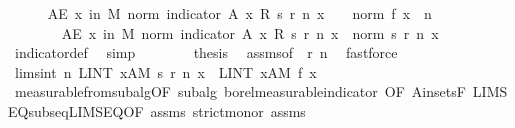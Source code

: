 \begin{isabellebody}
\isanewline
\ \ \ \ \isamarkupfalse%
\ {\isachardoublequoteopen}AE\ x\ in\ M{\isachardot}{\kern0pt}\ norm\ {\isacharparenleft}{\kern0pt}indicator\ A\ x\ {\isacharasterisk}{\kern0pt}\isactrlsub R\ s\ {\isacharparenleft}{\kern0pt}r\ n{\isacharparenright}{\kern0pt}\ x{\isacharparenright}{\kern0pt}\ {\isasymle}\ {}\ {\isacharasterisk}{\kern0pt}\ norm\ {\isacharparenleft}{\kern0pt}f\ x{\isacharparenright}{\kern0pt}{\isachardoublequoteclose}\ \ n\isanewline
\ \ \ \ \isamarkupfalse%
\ {\isacharminus}{\kern0pt}\isanewline
\ \ \ \ \ \ \isamarkupfalse%
\ {\isachardoublequoteopen}AE\ x\ in\ M{\isachardot}{\kern0pt}\ norm\ {\isacharparenleft}{\kern0pt}indicator\ A\ x\ {\isacharasterisk}{\kern0pt}\isactrlsub R\ s\ {\isacharparenleft}{\kern0pt}r\ n{\isacharparenright}{\kern0pt}\ x{\isacharparenright}{\kern0pt}\ {\isasymle}\ norm\ {\isacharparenleft}{\kern0pt}s\ {\isacharparenleft}{\kern0pt}r\ n{\isacharparenright}{\kern0pt}\ x{\isacharparenright}{\kern0pt}{\isachardoublequoteclose}\ \isamarkupfalse%
\ indicator{\isacharunderscore}{\kern0pt}def\ \isamarkupfalse%
\ simp\isanewline
\ \ \ \ \ \ \isamarkupfalse%
\ {\isacharquery}{\kern0pt}thesis\ \isamarkupfalse%
\ assms{\isacharparenleft}{\kern0pt}{}{\isacharparenright}{\kern0pt}{\isacharbrackleft}{\kern0pt}of\ {\isacharunderscore}{\kern0pt}\ {\isachardoublequoteopen}r\ n{\isachardoublequoteclose}{\isacharbrackright}{\kern0pt}\ \isamarkupfalse%
\ fastforce\isanewline
\ \ \ \ \isamarkupfalse%
\isanewline
\ \ \ \ \isamarkupfalse%
\ lim{\isacharunderscore}{\kern0pt}s{\isacharunderscore}{\kern0pt}int{\isacharcolon}{\kern0pt}\ {\isachardoublequoteopen}{\isacharparenleft}{\kern0pt}{\isasymlambda}n{\isachardot}{\kern0pt}\ LINT\ x{\isacharcolon}{\kern0pt}A{\isacharbar}{\kern0pt}M{\isachardot}{\kern0pt}\ s\ {\isacharparenleft}{\kern0pt}r\ n{\isacharparenright}{\kern0pt}\ x{\isacharparenright}{\kern0pt}\ {\isasymlonglonglongrightarrow}\ LINT\ x{\isacharcolon}{\kern0pt}A{\isacharbar}{\kern0pt}M{\isachardot}{\kern0pt}\ f\ x{\isachardoublequoteclose}\isanewline
\ \ \ \ \ \ \isamarkupfalse%
\ measurable{\isacharunderscore}{\kern0pt}from{\isacharunderscore}{\kern0pt}subalg{\isacharbrackleft}{\kern0pt}OF\ subalg\ borel{\isacharunderscore}{\kern0pt}measurable{\isacharunderscore}{\kern0pt}indicator{\isacharcomma}{\kern0pt}\ OF\ A{\isacharunderscore}{\kern0pt}in{\isacharunderscore}{\kern0pt}sets{\isacharunderscore}{\kern0pt}F{\isacharbrackright}{\kern0pt}\ LIMSEQ{\isacharunderscore}{\kern0pt}subseq{\isacharunderscore}{\kern0pt}LIMSEQ{\isacharbrackleft}{\kern0pt}OF\ assms{\isacharparenleft}{\kern0pt}{}{\isacharparenright}{\kern0pt}\ strict{\isacharunderscore}{\kern0pt}mono{\isacharunderscore}{\kern0pt}r{\isacharbrackright}{\kern0pt}\ assms{\isacharparenleft}{\kern0pt}{}{\isacharparenright}{\kern0pt}\isanewline

\end{isabellebody}
